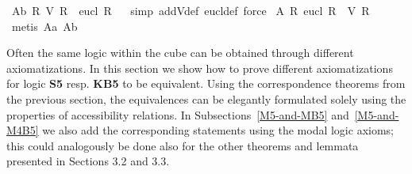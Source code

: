 \begin{isabellebody}
\ A{}{\isacharunderscore}b{\isacharcolon}\ {\isachardoublequoteopen}{\isacharparenleft}{\isasymforall}R{\isachardot}\ {\isacharparenleft}V\ R{\isacharparenright}\ {\isasymlongrightarrow}\ {\isacharparenleft}eucl\ R{\isacharparenright}{\isacharparenright}{\isachardoublequoteclose}%
\isadelimproof
\ %
\endisadelimproof
%
\isatagproof
{}\isamarkupfalse%
\ {\isacharparenleft}simp\ add{\isacharcolon}V{\isacharunderscore}def\ eucl{\isacharunderscore}def{\isacharcomma}\ force{\isacharparenright}%
\endisatagproof
{\isafoldproof}%
%
\isadelimproof
%
\endisadelimproof
\isanewline
{}\isamarkupfalse%
\ A{}{\isacharcolon}\ {\isachardoublequoteopen}{\isacharparenleft}{\isasymforall}R{\isachardot}\ {\isacharparenleft}eucl\ R{\isacharparenright}\ {\isasymlongleftrightarrow}\ {\isacharparenleft}V\ R{\isacharparenright}{\isacharparenright}{\isachardoublequoteclose}%
\isadelimproof
\ %
\endisadelimproof
%
\isatagproof
{}\isamarkupfalse%
\ {\isacharparenleft}metis\ A{}{\isacharunderscore}a\ A{}{\isacharunderscore}b{\isacharparenright}%
\endisatagproof
{\isafoldproof}%
%
\isadelimproof
%
\endisadelimproof
%
\isamarkuptrue%
%
\begin{isamarkuptext}%
Often the same logic within the cube can be obtained through different axiomatizations.
In this section we show how to prove different axiomatizations for logic \textbf{S5} resp. \textbf{KB5} to be equivalent. Using the
correspondence theorems from the previous section, the equivalences can be elegantly formulated solely using the properties
of accessibility relations. In Subsections~\ref{M5-and-MB5} and~\ref{M5-and-M4B5} we also add the corresponding 
statements using the modal logic axioms; this could analogously be done also for the other theorems and lemmata 
presented in Sections {{3.2 and 3.3}}.


\end{isamarkuptext}
\end{isabellebody}
